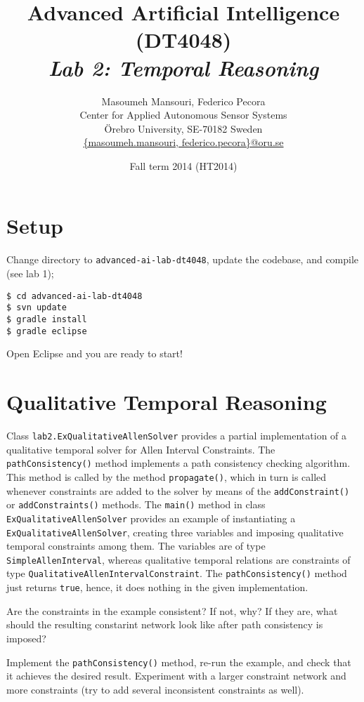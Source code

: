 \documentclass[a4paper]{article}
\title{Advanced Artificial Intelligence (DT4048)\\{\em Lab 2: Temporal Reasoning}}
\author{Masoumeh Mansouri, Federico Pecora\\Center for Applied Autonomous Sensor Systems\\\"Orebro University, SE-70182 Sweden\\\url{{masoumeh.mansouri, federico.pecora}@oru.se}}
\date{Fall term 2014 (HT2014)}
\begin{document}
\maketitle

\section{Setup}

Change directory to {\tt advanced-ai-lab-dt4048}, update the codebase, and compile (see lab 1);

\begin{lstlisting}
$ cd advanced-ai-lab-dt4048
$ svn update
$ gradle install
$ gradle eclipse
\end{lstlisting}

Open Eclipse and you are ready to start!

\section{Qualitative Temporal Reasoning}

Class {\tt lab2.ExQualitativeAllenSolver} provides a partial implementation of a qualitative temporal solver for Allen Interval Constraints.  The {\tt pathConsistency()} method implements a path consistency checking algorithm.  This method is called by the method {\tt propagate()}, which in turn is called whenever constraints are added to the solver by means of the {\tt addConstraint()} or {\tt addConstraints()} methods. The {\tt main()} method in class {\tt ExQualitativeAllenSolver} provides an example of instantiating a {\tt ExQualitativeAllenSolver}, creating three variables and imposing qualitative temporal constraints among them.  The variables are of type {\tt SimpleAllenInterval}, whereas qualitative temporal relations are constraints of type {\tt QualitativeAllenIntervalConstraint}.  The {\tt pathConsistency()} method just returns {\tt true}, hence, it does nothing in the given implementation.

{\ex{}\label{ex:ex1}  Are the constraints in the example consistent?  If not, why?  If they are, what should the resulting constarint network look like after path consistency is imposed?\vspace{0.1cm}}

{\ex{}\label{ex:ex2} Implement the {\tt pathConsistency()} method, re-run the example, and check that it achieves the desired result.  Experiment with a larger constraint network and more constraints (try to add several inconsistent constraints as well). \vspace{0.1cm}}
\end{document}
